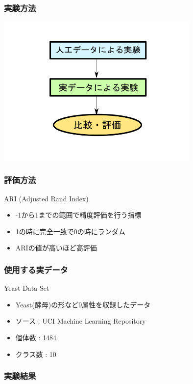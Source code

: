 \documentclass[13pt,dvipdfmx]{beamer}
\begin{document}
\begin{frame}\frametitle{実験方法}
\begin{center}
 \includegraphics[width=100mm]{experiment_process.png}
\end{center}
\end{frame}

\begin{frame}\frametitle{評価方法}
\begin{block}{ARI (Adjusted Rand Index)}
\begin{itemize}
 \item -1から1までの範囲で精度評価を行う指標
 \item 1の時に完全一致で0の時にランダム
 \item ARIの値が高いほど高評価
\end{itemize}
\end{block}
\begin{center}
\end{center}
\end{frame}

\begin{frame}\frametitle{使用する実データ}
  \begin{block}{Yeast Data Set}
    \begin{itemize}
    \item Yeast(酵母)の形など9属性を収録したデータ
    \item ソース : UCI  Machine Learning Repository
    \item 個体数 : 1484
    \item クラス数 : 10
    \end{itemize}
  \end{block}
\end{frame}

\begin{frame}\frametitle{実験結果}
\end{frame}
\end{document}
